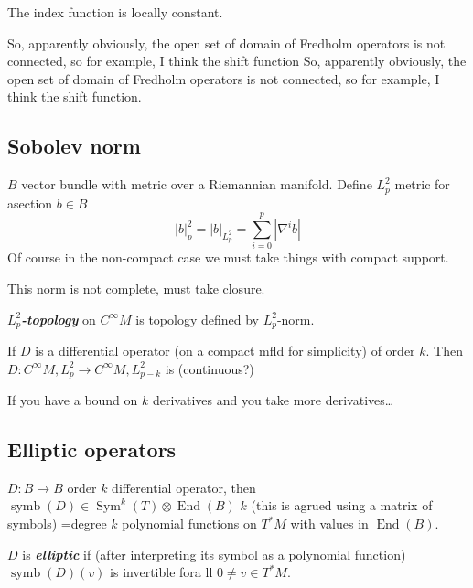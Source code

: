 \begin{thm}\leavevmode
The index function is locally constant.
\end{thm}

So, apparently obviously, the open set of domain of Fredholm operators is not connected, so for example, I think the shift function
So, apparently obviously, the open set of domain of Fredholm operators is not connected, so for example, I think the shift function.

\subsection{Sobolev norm}

\begin{defn}\leavevmode
\(B\) vector bundle with metric over a Riemannian manifold. Define \(L^2_p\) metric for asection \(b \in B\) 
\[|b|^2_p=|b|_{L^2_p}=\sum_{i=0}^p |\nabla^i b|\]
Of course in the non-compact case we must take things with compact support.
\end{defn}

\begin{remark}\leavevmode
This norm is not complete, must take closure.
\end{remark}

\begin{defn}\leavevmode
\(L^2_p\)\textit{\textbf{-topology}} on \(C^\infty M\) is topology defined by \(L^2_p\)-norm.
\end{defn}

\begin{remark}\leavevmode
If \(D\) is a differential operator (on a compact mfld for simplicity) of order \(k\). Then \(D : C^\infty  M,L^2_p \to C^\infty M,L^2_{p-k}\) is (continuous?)

If you have a bound on \(k\) derivatives and you take  more derivatives…
\end{remark}

\subsection{Elliptic operators}

\begin{defn}\leavevmode
\(D: B \to B\) order \(k\) differential operator, then \( \operatorname{symb}(D) \in \operatorname{Sym}^k(T)\otimes \operatorname{End}(B)\) \(k\) (this is agrued using a matrix of symbols) =degree \(k\) polynomial functions on \(T^*M\) with values in \(\operatorname{End}(B)\).

\(D\) is \textit{\textbf{elliptic}} if (after interpreting its symbol as a polynomial function) \(\operatorname{symb}(D)(v)\) is invertible fora ll \(0 \neq  v \in T^*M \).
\end{defn}

